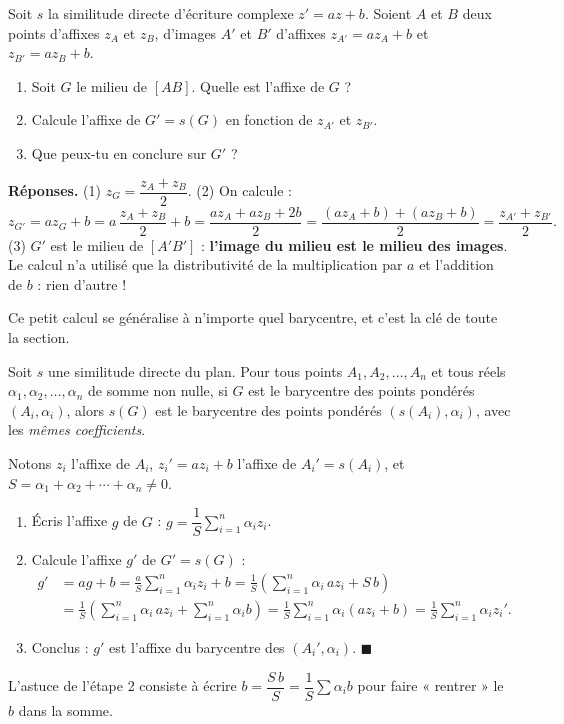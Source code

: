 \documentclass[11pt]{article}
\begin{document}
\begin{experience}
Soit $s$ la similitude directe d'écriture complexe $z' = az + b$. Soient $A$ et $B$ deux points d'affixes $z_A$ et $z_B$, d'images $A'$ et $B'$ d'affixes $z_{A'} = a z_A + b$ et $z_{B'} = a z_B + b$.
\begin{enumerate}
\item Soit $G$ le milieu de $[AB]$. Quelle est l'affixe de $G$ ?
\item Calcule l'affixe de $G' = s(G)$ en fonction de $z_{A'}$ et $z_{B'}$.
\item Que peux-tu en conclure sur $G'$ ?
\end{enumerate}
\textbf{Réponses.} (1) $z_G = \dfrac{z_A + z_B}{2}$. (2) On calcule :
\[ z_{G'} = a z_G + b = a\,\frac{z_A + z_B}{2} + b = \frac{a z_A + a z_B + 2b}{2} = \frac{(a z_A + b) + (a z_B + b)}{2} = \frac{z_{A'} + z_{B'}}{2}. \]
(3) $G'$ est le milieu de $[A'B']$ : \textbf{l'image du milieu est le milieu des images}. Le calcul n'a utilisé que la distributivité de la multiplication par $a$ et l'addition de $b$ : rien d'autre !
\end{experience}

Ce petit calcul se généralise à n'importe quel barycentre, et c'est la clé de toute la section.

\begin{propriete}
Soit $s$ une similitude directe du plan. Pour tous points $A_1, A_2, \ldots, A_n$ et tous réels $\alpha_1, \alpha_2, \ldots, \alpha_n$ de somme non nulle, si $G$ est le barycentre des points pondérés $(A_i, \alpha_i)$, alors $s(G)$ est le barycentre des points pondérés $(s(A_i), \alpha_i)$, avec les \emph{mêmes coefficients}.
\end{propriete}

\begin{experience}
Notons $z_i$ l'affixe de $A_i$, $z_i' = a z_i + b$ l'affixe de $A_i' = s(A_i)$, et $S = \alpha_1 + \alpha_2 + \cdots + \alpha_n \neq 0$.
\begin{enumerate}
\item Écris l'affixe $g$ de $G$ : $g = \dfrac{1}{S}\displaystyle\sum_{i=1}^{n} \alpha_i z_i$.
\item Calcule l'affixe $g'$ de $G' = s(G)$ :
\begin{align*}
g' &= a g + b = \frac{a}{S}\sum_{i=1}^{n} \alpha_i z_i + b = \frac{1}{S}\left(\sum_{i=1}^{n} \alpha_i\, a z_i + S\, b\right) \\
&= \frac{1}{S}\left(\sum_{i=1}^{n} \alpha_i\, a z_i + \sum_{i=1}^{n} \alpha_i b\right) = \frac{1}{S}\sum_{i=1}^{n} \alpha_i (a z_i + b) = \frac{1}{S}\sum_{i=1}^{n} \alpha_i z_i'.
\end{align*}
\item Conclus : $g'$ est l'affixe du barycentre des $(A_i', \alpha_i)$. \hfill $\blacksquare$
\end{enumerate}
L'astuce de l'étape 2 consiste à écrire $b = \dfrac{S\, b}{S} = \dfrac{1}{S}\sum \alpha_i b$ pour faire « rentrer » le $b$ dans la somme.
\end{experience}
\end{document}
